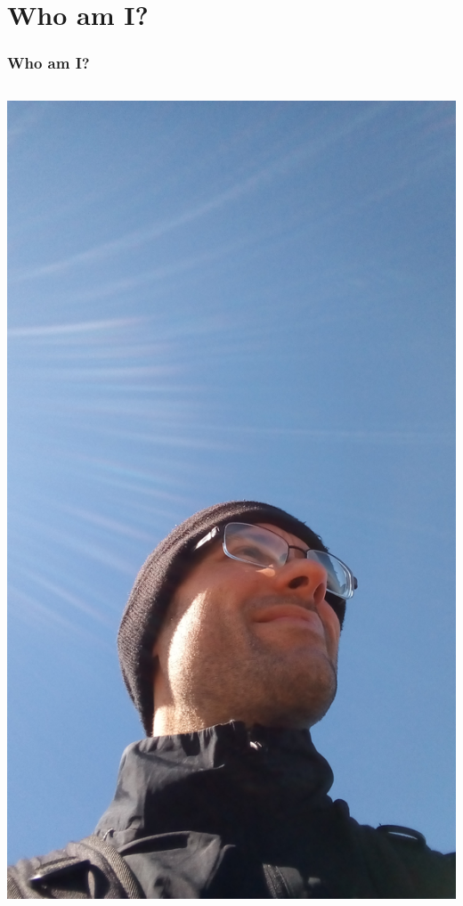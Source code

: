 \section{Who am I?}

\begin{frame}
\frametitle{Who am I?}
  \begin{columns}
    \begin{column}{0.3\textwidth} 
\includegraphics[width=1.1\textwidth]{presentation/IMG_20180922_120515771.jpg}

\end{column}
\end{columns}
\end{frame}
